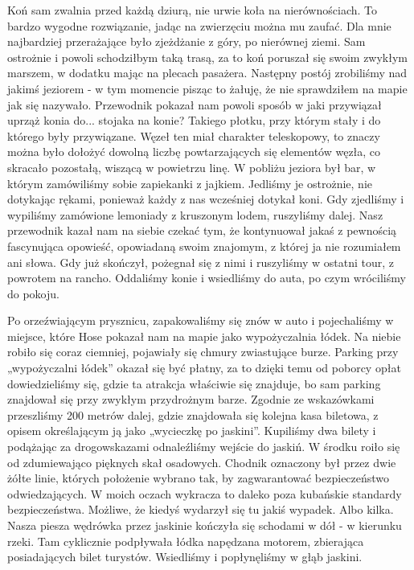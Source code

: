 Koń sam zwalnia przed każdą dziurą, nie urwie koła na nierównościach.
To bardzo wygodne rozwiązanie, jadąc na zwierzęciu można mu zaufać.
Dla mnie najbardziej przerażające było zjeżdżanie z góry, po nierównej ziemi.
Sam ostrożnie i powoli schodziłbym taką trasą, za to koń poruszał się swoim zwykłym marszem, w dodatku mając na plecach pasażera.
Następny postój zrobiliśmy nad jakimś jeziorem - w tym momencie pisząc to żałuję, że nie sprawdziłem na mapie jak się nazywało.
Przewodnik pokazał nam powoli sposób w jaki przywiązał uprząż konia do...
stojaka na konie?
Takiego płotku, przy którym stały i do którego były przywiązane.
Węzeł ten miał charakter teleskopowy, to znaczy można było dołożyć dowolną liczbę powtarzających się elementów węzła, co skracało pozostałą, wiszącą w powietrzu linę.
W pobliżu jeziora był bar, w którym zamówiliśmy sobie zapiekanki z jajkiem.
Jedliśmy je ostrożnie, nie dotykając rękami, ponieważ każdy z nas wcześniej dotykał koni.
Gdy zjedliśmy i wypiliśmy zamówione lemoniady z kruszonym lodem, ruszyliśmy dalej.
Nasz przewodnik kazał nam na siebie czekać tym, że kontynuował jakaś z pewnością fascynująca opowieść, opowiadaną swoim znajomym, z której ja nie rozumiałem ani słowa.
Gdy już skończył, pożegnał się z nimi i ruszyliśmy w ostatni tour, z powrotem na rancho.
Oddaliśmy konie i wsiedliśmy do auta, po czym wróciliśmy do pokoju.
\par Po orzeźwiającym prysznicu, zapakowaliśmy się znów w auto i pojechaliśmy w miejsce, które Hose pokazał nam na mapie jako wypożyczalnia łódek.
Na niebie robiło się coraz ciemniej, pojawiały się chmury zwiastujące burze.
Parking przy „wypożyczalni łódek” okazał się być płatny, za to dzięki temu od poborcy opłat dowiedzieliśmy się, gdzie ta atrakcja właściwie się znajduje, bo sam parking znajdował się przy zwykłym przydrożnym barze.
Zgodnie ze wskazówkami przeszliśmy 200 metrów dalej, gdzie znajdowała się kolejna kasa biletowa, z opisem określającym ją jako „wycieczkę po jaskini”.
Kupiliśmy dwa bilety i podążając za drogowskazami odnaleźliśmy wejście do jaskiń.
W środku roiło się od zdumiewająco pięknych skał osadowych.
Chodnik oznaczony był przez dwie żółte linie, których położenie wybrano tak, by zagwarantować bezpieczeństwo odwiedzających.
W moich oczach wykracza to daleko poza kubańskie standardy bezpieczeństwa.
Możliwe, że kiedyś wydarzył się tu jakiś wypadek.
Albo kilka.
Nasza piesza wędrówka przez jaskinie kończyła się schodami w dół - w kierunku rzeki.
Tam cyklicznie podpływała łódka napędzana motorem, zbierająca posiadających bilet turystów.
Wsiedliśmy i popłynęliśmy w głąb jaskini.
